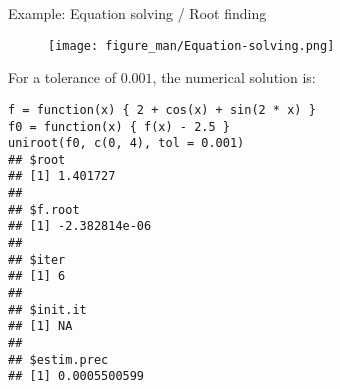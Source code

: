 \documentclass[11pt,compress,t,notes=noshow, xcolor=table]{beamer}
\begin{document}
\begin{vbframe}{Example: Equation solving / Root finding}

\begin{center}
\begin{figure}
  \texttt{[image: figure\_man/Equation-solving.png]}
\end{figure}
\end{center}

\framebreak

For a tolerance of $0.001$, the numerical solution is:

\footnotesize
\begin{verbatim}
f = function(x) { 2 + cos(x) + sin(2 * x) }
f0 = function(x) { f(x) - 2.5 }
uniroot(f0, c(0, 4), tol = 0.001)
## $root
## [1] 1.401727
##
## $f.root
## [1] -2.382814e-06
##
## $iter
## [1] 6
##
## $init.it
## [1] NA
##
## $estim.prec
## [1] 0.0005500599
\end{verbatim}


\end{vbframe}











\end{document}
